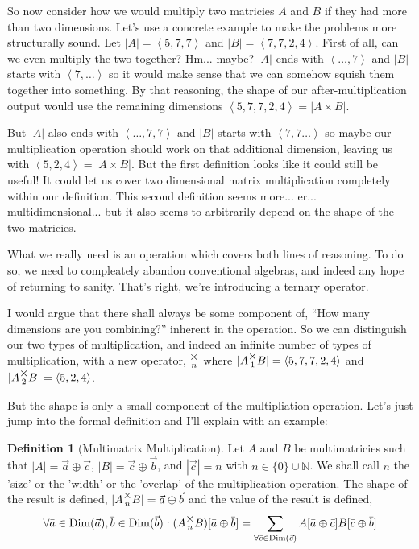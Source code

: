 \documentclass[12pt]{book}
\theoremstyle{definition}
\newtheorem{definition}{Definition}[chapter]
\theoremstyle{plain}
\theoremstyle{ppart}
\theoremstyle{case}
\theoremstyle{solution}
\DeclareMathOperator{\Dim}{Dim}
\newcommand{\mmult}[1]{\text{\raisebox{1ex}{$\underset{#1}{\times}$}}}
\begin{document}
So now consider how we would multiply two matricies $A$ and $B$ if they had more
than two dimensions. Let's use a concrete example to make the problems more
structurally sound.
Let $|A| = \left<5,7,7\right>$ and $|B| = \left<7,7,2,4\right>$.
First of all, can we even multiply the two together? Hm... maybe? $|A|$ ends with
$\left<\ldots, 7\right>$ and $|B|$ starts with $\left<7,\ldots\right>$ so it would
make sense that we can somehow squish them together into something. By that reasoning,
the shape of our after-multiplication output would use the remaining dimensions
$\left<5, 7, 7, 2, 4\right> = |A \times B|$.

But $|A|$ also ends with $\left<\ldots, 7, 7\right>$ and $|B|$ starts with
$\left<7, 7\ldots\right>$ so maybe our multiplication operation should work on that
additional dimension, leaving us with $\left<5, 2, 4\right> = |A \times B|$.
But the first definition looks like it could still be useful! It could let us cover 
two dimensional matrix multiplication completely within our definition. This second
definition seems more... er... multidimensional... but it also seems to
arbitrarily depend on the shape of the two matricies.

What we really need is an operation which covers both lines of reasoning. To do
so, we need to compleately abandon conventional algebras, and indeed any hope of
returning to sanity. That's right, we're introducing a ternary operator.

I would argue that there shall always be some component of, 
``How many dimensions are you combining?'' inherent
in the operation. So we can distinguish our two types of multiplication, and indeed
an infinite number of types of multiplication, with a new operator, $\mmult{n}$ where
$|A \mmult{1} B| = \left<5, 7, 7, 2, 4\right>$ and 
$|A \mmult{2} B| = \left<5, 2, 4\right>$.

But the shape is only a small component of the multipliation  operation. Let's
just jump into the formal definition and I'll explain with an example:

\begin{definition}[Multimatrix Multiplication]
\label{mm_mult}
Let $A$ and $B$ be multimatricies such that $|A| = \vec{a} \oplus \vec{c}$,
$|B| = \vec{c} \oplus \vec{b}$, and $|\vec{c}| = n$ with
$n \in \{0\} \cup \mathbb{N}$. We shall call $n$ the 'size' or the 'width'
or the 'overlap' of the multiplication operation.
The shape of the result is defined, $|A \mmult{n} B| = \vec{a} \oplus \vec{b}$
and the value of the result is defined,
\[
\forall \bar{a} \in \Dim(\vec{a}), \bar{b} \in \Dim(\vec{b}):
(A \mmult{n}  B)[\bar{a} \oplus \bar{b}] =
\sum_{\forall \bar{c} \in \Dim(\vec{c})}
  A[\bar{a} \oplus \bar{c}] B[\bar{c} \oplus \bar{b}]
\]
\end{definition}
\end{document}

